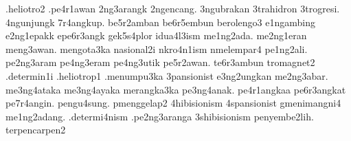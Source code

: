 {.heliotro2 .pe4r1awan 2ng3arangk 2ngencang. 3ngubrakan 3trahidron 3trogresi. 4ngunjungk 7r4angkup. be5r2amban be6r5embun berolengo3 e1ngambing e2ng1epakk epe6r3angk gek5s4plor idua4l3ism me1ng2ada. me2ng1eran meng3awan. mengota3ka nasional2i nkro4n1ism nmelempar4 pe1ng2ali. pe2ng3aram pe4ng3eram pe4ng3utik pe5r2awan. te6r3ambun tromagnet2
.determin1i .heliotrop1 .menumpu3ka 3pansionist e3ng2ungkan me2ng3abar. me3ng4ataka me3ng4ayaka merangka3ka pe3ng4anak. pe4r1angkaa pe6r3angkat pe7r4angin. pengu4sung. pmenggelap2 4hibisionism 4spansionist gmenimangni4 me1ng2adang.
.determi4nism .pe2ng3aranga 3shibisionism penyembe2lih. terpencarpen2
}
\hyphenation{}
